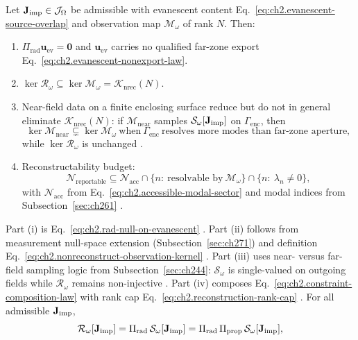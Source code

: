 Let \(\mathbf{J}_{\mathrm{imp}}\in\mathcal{J}_\Omega\) be admissible with evanescent content
Eq.~\eqref{eq:ch2.evanescent-source-overlap} and observation map
\(\mathcal{M}_\omega\) of rank \(N\). Then:
\begin{enumerate}
\item[(i)] \(\Pi_{\mathrm{rad}}\mathbf{u}_{\mathrm{ev}}=\mathbf{0}\) and
\(\mathbf{u}_{\mathrm{ev}}\) carries no qualified far-zone export
Eq.~\eqref{eq:ch2.evanescent-nonexport-law}.
\item[(ii)] \(\ker\mathcal{R}_\omega\subseteq\ker\mathcal{M}_\omega=\mathcal{K}_{\mathrm{nrec}}(N)\).
\item[(iii)] Near-field data on a finite enclosing surface reduce but do not in general
eliminate \(\mathcal{K}_{\mathrm{nrec}}(N)\): if \(\mathcal{M}_{\mathrm{near}}\) samples
\(\mathcal{S}_\omega[\mathbf{J}_{\mathrm{imp}}]\) on \(\Gamma_{\mathrm{enc}}\), then
\begin{equation}
\label{eq:ch2.near-field-nullity-reduction}
\ker\mathcal{M}_{\mathrm{near}}
\subsetneq
\ker\mathcal{M}_\omega
\ \text{when}\ \Gamma_{\mathrm{enc}}\ \text{resolves more modes than far-zone aperture},
\end{equation}
while \(\ker\mathcal{R}_\omega\) is unchanged \cite{stratton1941}.
\item[(iv)] Reconstructability budget:
\begin{equation}
\label{eq:ch2.reconstructability-budget}
\mathcal{N}_{\mathrm{reportable}}
\subseteq
\mathcal{N}_{\mathrm{acc}}
\cap
\{n:\ \text{resolvable by}\ \mathcal{M}_\omega\}
\cap
\{n:\ \lambda_n\neq 0\},
\end{equation}
with \(\mathcal{N}_{\mathrm{acc}}\) from Eq.~\eqref{eq:ch2.accessible-modal-sector} and modal
indices from Subsection~\ref{sec:ch261} \cite{stratton1941}.
\end{enumerate}
Part (i) is Eq.~\eqref{eq:ch2.rad-null-on-evanescent} \cite{stratton1941}. Part (ii) follows
from measurement null-space extension (Subsection~\ref{sec:ch271}) and definition
Eq.~\eqref{eq:ch2.nonreconstruct-observation-kernel} \cite{harrington2001}. Part (iii) uses
near- versus far-field sampling logic from Subsection~\ref{sec:ch244}: \(\mathcal{S}_\omega\) is
single-valued on outgoing fields while \(\mathcal{R}_\omega\) remains non-injective
\cite{stratton1941}. Part (iv) composes
Eq.~\eqref{eq:ch2.constraint-composition-law} with rank cap
Eq.~\eqref{eq:ch2.reconstruction-rank-cap} \cite{stratton1941}.
\label{prop:ch2.evanescent-never-exports}
For all admissible \(\mathbf{J}_{\mathrm{imp}}\),
\begin{equation}
\label{eq:ch2.evanescent-radiation-annihilation}
\mathcal{R}_\omega[\mathbf{J}_{\mathrm{imp}}]
=
\Pi_{\mathrm{rad}}\,\mathcal{S}_\omega[\mathbf{J}_{\mathrm{imp}}]
=
\Pi_{\mathrm{rad}}\,\Pi_{\mathrm{prop}}\,\mathcal{S}_\omega[\mathbf{J}_{\mathrm{imp}}],
\end{equation}
